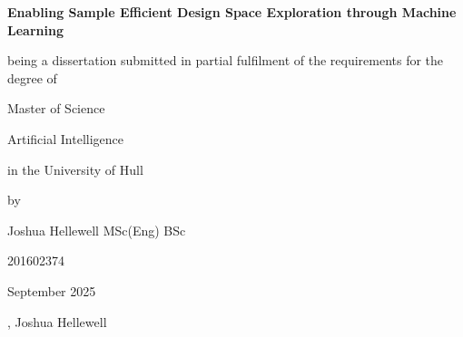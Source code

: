 \documentclass{article}
\begin{document}
\begin{titlepage}
  \thispagestyle{empty}

  \noindent{}%

  \vspace*{1.2cm}

  \begin{center}
    {\Huge\bfseries Enabling Sample Efficient Design Space Exploration through Machine Learning\par}
    \vspace{1.5cm}

    {\Large being a dissertation submitted in partial fulfilment of the requirements for the degree of \par}
    \vspace{0.6cm}

    {\LARGE Master of Science\par}
    \vspace{0.4cm}

    {\Large Artificial Intelligence\par}
    \vspace{0.6cm}

    {\large in the University of Hull\par}
    \vspace{2cm}

    {\Large by\par}
    \vspace{0.6cm}

    {\LARGE Joshua Hellewell MSc(Eng) BSc\par}
    {\LARGE 201602374\par}
  \end{center}

  \vfill

  \begin{center}
    {\large September 2025\par}
    \vspace{0.4cm}
    {\small {}, Joshua Hellewell\par}
  \end{center}
\end{titlepage}
\end{document}
